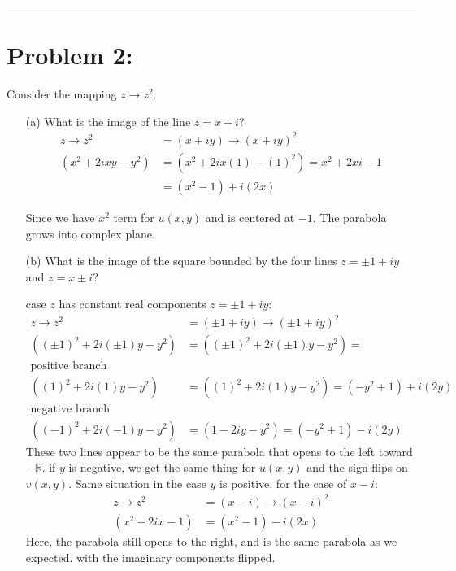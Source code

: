 \documentclass{article}
\begin{document}
\vspace{1cm}
\hrule %

\newpage
\section*{Problem 2:}
Consider the mapping $z \xrightarrow{} z^2$.
\begin{enumerate}
\item[(a)] What is the image of the line $z  = x + i$?
  \begin{align*}
    z \xrightarrow{} z^2  &= (x+iy) \xrightarrow{} (x+iy)^2\\
    (x^2+2ixy-y^2) &= (x^2+2ix(1)-(1)^2) = x^2 + 2xi - 1 \\
    &= (x^2-1) + i(2x)   
  \end{align*}
  
   Since we have $x^2$ term for $u(x,y)$ and is centered at $-1$. The parabola grows into complex plane.
  
\item[(b)] What is the image of the square bounded by the four lines $z  = \pm 1 + iy$ and $z = x \pm i$?

  case $z$ has constant real components $z  = \pm 1 + iy$:
  \begin{align*}
    z \xrightarrow{} z^2  &= (\pm 1+iy) \xrightarrow{} (\pm 1+iy)^2\\
    ((\pm 1)^2+2i(\pm 1)y-y^2) &= ((\pm 1)^2+2i(\pm 1)y-y^2) = \\
    \text{positive branch}&\\
    ((1)^2+2i(1)y-y^2) &= ((1)^2+2i(1)y-y^2) = (-y^2+1)+i(2y) \\
    \text{negative branch}&\\
    ((-1)^2+2i(-1)y-y^2) &= (1-2iy-y^2) = (-y^2+1)-i(2y)
  \end{align*}
  These two lines appear to be the same parabola that opens to the left toward $-\mathbb{R}$. if $y$ is negative, we get the same thing for $u(x,y)$ and the sign flips on $v(x,y)$. Same situation in the case $y$ is positive. 
  for the case of $x-i$:
    \begin{align*}
    z \xrightarrow{} z^2  &= (x-i) \xrightarrow{} (x-i)^2\\
    (x^2-2ix-1) &= (x^2-1) - i(2x)   
    \end{align*}
    Here, the parabola still opens to the right, and is the same parabola as we expected. with the imaginary components flipped.

\end{enumerate}
\end{document}
